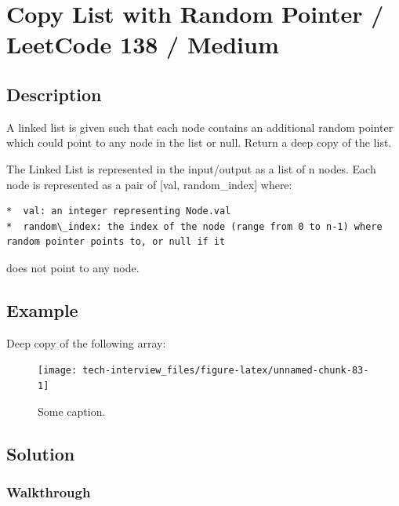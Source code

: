 \documentclass[]{book}
\begin{document}
\hypertarget{copy-list-with-random-pointer-leetcode-138-medium}{%
\section{Copy List with Random Pointer / LeetCode 138 / Medium}\label{copy-list-with-random-pointer-leetcode-138-medium}}

\hypertarget{description-101}{%
\subsection{Description}\label{description-101}}

A linked list is given such that each node contains an additional random pointer which could point to any node in the
list or null. Return a deep copy of the list.

The Linked List is represented in the input/output as a list of n nodes. Each node is represented as a pair of
{[}val, random\_index{]} where:

\begin{verbatim}
*  val: an integer representing Node.val
*  random\_index: the index of the node (range from 0 to n-1) where random pointer points to, or null if it
\end{verbatim}

does not point to any node.

\hypertarget{example-97}{%
\subsection{Example}\label{example-97}}

Deep copy of the following array:

\begin{figure}
\texttt{[image: tech-interview\_files/figure-latex/unnamed-chunk-83-1]} \caption{Some caption.}\label{fig:unnamed-chunk-83}
\end{figure}

\hypertarget{solution-70}{%
\subsection{Solution}\label{solution-70}}

\hypertarget{walkthrough-119}{%
\subsubsection{Walkthrough}\label{walkthrough-119}}
\end{document}
